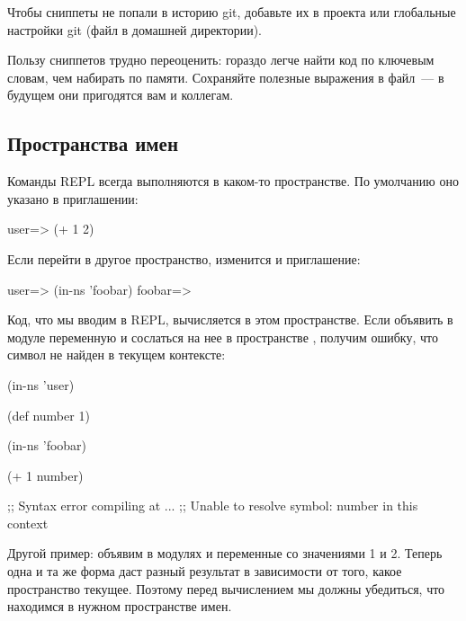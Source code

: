 Чтобы сниппеты не попали в историю git, добавьте их в  проекта или глобальные настройки git (файл  в домашней директории).

Пользу сниппетов трудно переоценить: гораздо легче найти код по ключевым словам, чем набирать по памяти. Сохраняйте полезные выражения в файл~--- в будущем они пригодятся вам и коллегам.

\subsection{Пространства имен}

Команды REPL всегда выполняются в каком-то пространстве. По умолчанию оно указано в приглашении:

\begin{english}
  \begin{clojure}
user=> (+ 1 2)
  \end{clojure}
\end{english}

Если перейти в другое пространство, изменится и приглашение:

\begin{english}
  \begin{clojure}
user=> (in-ns 'foobar)
foobar=>
  \end{clojure}
\end{english}

Код, что мы вводим в REPL, вычисляется в этом пространстве. Если объявить в модуле  переменную  и сослаться на нее в пространстве , получим ошибку, что символ не найден в текущем контексте:

\begin{english}
  \begin{clojure}
(in-ns 'user)

(def number 1)

(in-ns 'foobar)

(+ 1 number)

;; Syntax error compiling at ...
;; Unable to resolve symbol: number in this context
  \end{clojure}
\end{english}

Другой пример: объявим в модулях  и  переменные  со значениями 1 и 2. Теперь одна и та же форма  даст разный результат в зависимости от того, какое пространство текущее. Поэтому перед вычислением мы должны убедиться, что находимся в нужном пространстве имен.

